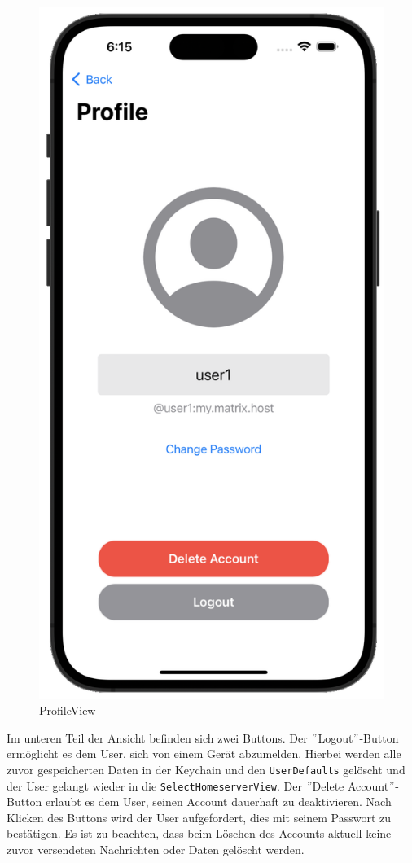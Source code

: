     \begin{figure}[h]
        \includegraphics[scale=0.5]{profile_white}
        \centering
        \caption{ProfileView}\label{fig:profileview}
    \end{figure}
    Im unteren Teil der Ansicht befinden sich zwei Buttons.
    Der \("\)Logout\("\)-Button ermöglicht es dem User, sich von einem Gerät abzumelden.
    Hierbei werden alle zuvor gespeicherten Daten in der Keychain und den \texttt{UserDefaults} gelöscht und der User gelangt wieder in die \texttt{SelectHomeserverView}.
    Der \("\)Delete Account\("\)-Button erlaubt es dem User, seinen Account dauerhaft zu deaktivieren.
    Nach Klicken des Buttons wird der User aufgefordert, dies mit seinem Passwort zu bestätigen.
    Es ist zu beachten, dass beim Löschen des Accounts aktuell keine zuvor versendeten Nachrichten oder Daten gelöscht werden.

